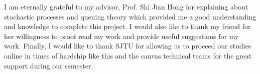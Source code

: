 I am eternally grateful to my advisor, Prof. Shi Jian Hong for explaining about stochastic processes and queuing theory which provided me a good understanding and knowledge to complete this project. I would also like to thank my friend for her willingness to proof read my work and provide useful suggestions for my work. Finally, I would like to thank SJTU for allowing us to proceed our studies online in times of hardship like this and the canvas technical teams for the great support during our semester.